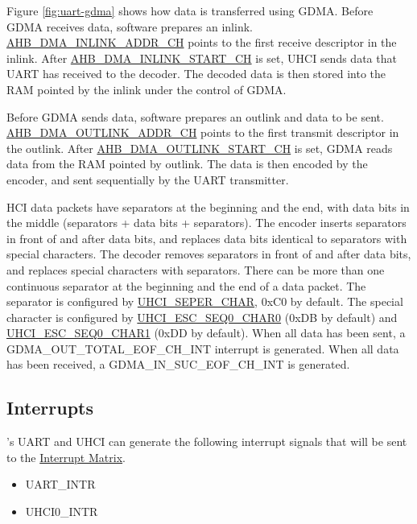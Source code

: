 \documentclass[main\_\_EN.tex]{subfiles}
\begin{document}
Figure \ref{fig:uart-gdma} shows how data is transferred using GDMA. Before GDMA receives data, software prepares an inlink. \hyperref[fielddesc:AHBDMAINLINKADDRCHN]{AHB\_DMA\_INLINK\_ADDR\_CH} points to the first receive descriptor in the inlink. After \hyperref[fielddesc:AHBDMAINLINKSTARTCHN]{AHB\_DMA\_INLINK\_START\_CH} is set, UHCI sends data that UART has received to the decoder. The decoded data is then stored into the RAM pointed by the inlink under the control of GDMA.

Before GDMA sends data, software prepares an outlink and data to be sent. \hyperref[fielddesc:AHBDMAOUTLINKADDRCHN]{AHB\_DMA\_OUTLINK\_ADDR\_CH} points to the first transmit descriptor in the outlink. After \hyperref[fielddesc:AHBDMAOUTLINKSTARTCHN]{AHB\_DMA\_OUTLINK\_START\_CH} is set, GDMA reads data from the RAM pointed by outlink. The data is then encoded by the encoder, and sent sequentially by the UART transmitter.

HCI data packets have separators at the beginning and the end, with data bits in the middle (separators + data bits + separators). The encoder inserts separators in front of and after data bits, and replaces data bits identical to separators with special characters. The decoder removes separators in front of and after data bits, and replaces special characters with separators. There can be more than one continuous separator at the beginning and the end of a data packet. The separator is configured by \hyperref[fielddesc:UHCISEPERCHAR]{UHCI\_SEPER\_CHAR}, 0xC0 by default. The special character is configured by \hyperref[fielddesc:UHCIESCSEQ0CHAR0]{UHCI\_ESC\_SEQ0\_CHAR0} (0xDB by default) and \hyperref[fielddesc:UHCIESCSEQ0CHAR1]{UHCI\_ESC\_SEQ0\_CHAR1} (0xDD by default). When all data has been sent, a GDMA\_OUT\_TOTAL\_EOF\_CH\_INT interrupt is generated. When all data has been received, a GDMA\_IN\_SUC\_EOF\_CH\_INT is generated.


\subsection{Interrupts}

\chipname{}'s UART and UHCI can generate the following interrupt signals that will be sent to the \hyperref[mod:intmtrx]{Interrupt Matrix}.

    \begin{itemize}
        \item { UART\_INTR}
        \item { UHCI0\_INTR}
    \end{itemize}
\end{document}
